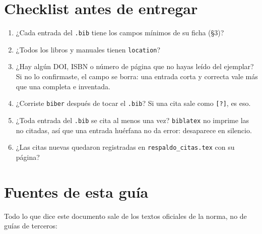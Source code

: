 \documentclass[11pt,a4paper]{article}
\begin{document}
\section{Checklist antes de entregar}

\begin{enumerate}\setlength{\itemsep}{3pt}
\item ¿Cada entrada del \texttt{.bib} tiene los campos mínimos de su ficha (§3)?
\item ¿Todos los libros y manuales tienen \texttt{location}?
\item ¿Hay algún DOI, ISBN o número de página que no hayas leído del ejemplar? Si no lo
  confirmaste, el campo se borra: una entrada corta y correcta vale más que una completa e
  inventada.
\item ¿Corriste \texttt{biber} después de tocar el \texttt{.bib}? Si una cita sale como
  \texttt{[?]}, es eso.
\item ¿Toda entrada del \texttt{.bib} se cita al menos una vez? \texttt{biblatex} no imprime
  las no citadas, así que una entrada huérfana no da error: desaparece en silencio.
\item ¿Las citas nuevas quedaron registradas en \texttt{respaldo\_citas.tex} con su página?
\end{enumerate}

\section{Fuentes de esta guía}

Todo lo que dice este documento sale de los textos oficiales de la norma, no de guías de
terceros:
\end{document}
